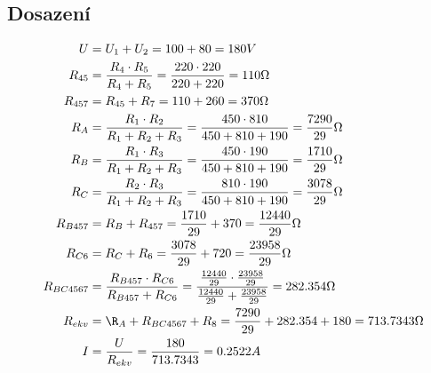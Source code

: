 \subsection{Dosazení}
\begin{figure}[H]

  \begin{equation*}
    \begin{aligned}
      U          & = U_1 + U_2 = 100 + 80 = 180V                                                                                                                          \\
      R_{45}     & = \frac{R_4 \cdot R_5}{R_4 + R_5} = \frac{220 \cdot 220}{220 + 220} = 110 \ohm                                                                         \\
      R_{457}    & = R_{45} + R_7 = 110 + 260 = 370 \ohm                                                                                                                  \\
      R_A        & = \frac{R_1 \cdot R_2}{R_1 + R_2 + R_3} = \frac{450 \cdot 810}{450 + 810 + 190} = \frac{7290}{29} \ohm                                                 \\
      R_B        & = \frac{R_1 \cdot R_3}{R_1 + R_2 + R_3} = \frac{450 \cdot 190}{450 + 810 + 190} = \frac{1710}{29} \ohm                                                 \\
      R_C        & = \frac{R_2 \cdot R_3}{R_1 + R_2 + R_3} = \frac{810 \cdot 190}{450 + 810 + 190} = \frac{3078}{29} \ohm                                                 \\
      R_{B457}   & = R_B + R_{457} = \frac{1710}{29} + 370 = \frac{12440}{29} \ohm                                                                                        \\
      R_{C6}     & = R_C + R_6 = \frac{3078}{29} + 720 = \frac{23958}{29} \ohm                                                                                            \\
      R_{BC4567} & = \frac{R_{B457} \cdot R_{C6}}{R_{B457} + R_{C6}} = \frac{\frac{12440}{29} \cdot \frac{23958}{29}}{\frac{12440}{29} + \frac{23958}{29}} = 282.354 \ohm \\
      R_{ekv}    & = \R_A + R_{BC4567} + R_8 = \frac{7290}{29} + 282.354 + 180 = 713.7343 \ohm                                                                            \\
      I          & = \frac{U}{R_{ekv}} = \frac{180}{713.7343} = 0.2522 A                                                                                                  \\

\end{aligned}
\end{equation*}
\end{figure}
